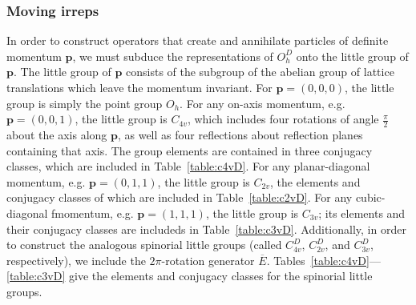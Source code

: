     \subsubsection{Moving irreps}
    In order to construct operators that create and annihilate particles of definite momentum $\boldsymbol p$, we must subduce the representations of $O_h^D$ onto the little group of $\boldsymbol p$. The little group of $\boldsymbol p$ consists of the subgroup of the abelian group of lattice translations which leave the momentum invariant. For $\boldsymbol p = (0, 0, 0)$, the little group is simply the point group $O_h$. For any on-axis momentum, e.g. $\boldsymbol p = (0, 0, 1)$, the little group is $C_{4v}$, which includes four rotations of angle $\frac{\pi}{2}$ about the axis along $\boldsymbol p$, as well as four reflections about reflection planes containing that axis. The group elements are contained in three conjugacy classes, which are included in Table~\ref{table:c4vD}.  For any planar-diagonal momentum, e.g. $\boldsymbol p = (0, 1, 1)$, the little group is $C_{2v}$, the elements and conjugacy classes of which are included in Table~\ref{table:c2vD}. For any cubic-diagonal fmomentum, e.g. $\boldsymbol p = (1,1,1)$, the little group is $C_{3v}$; its elements and their conjugacy classes are includeds in Table~\ref{table:c3vD}. Additionally, in order to construct the analogous spinorial little groups (called $C_{4v}^D$, $C_{2v}^D$, and $C_{3v}^D$, respectively), we include the $2\pi$-rotation generator $\overline E$. Tables~\ref{table:c4vD}---\ref{table:c3vD} give the elements and conjugacy classes for the spinorial little groups.
